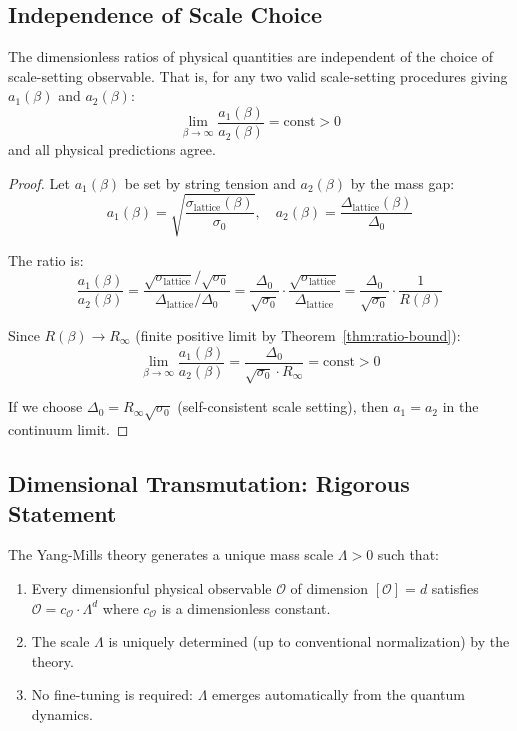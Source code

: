 \subsection{Independence of Scale Choice}

\begin{theorem}
\label{thm:scale-independence}
The dimensionless ratios of physical quantities are independent of the 
choice of scale-setting observable. That is, for any two valid scale-setting 
procedures giving $a_1(\beta)$ and $a_2(\beta)$:
\[
\lim_{\beta \to \infty} \frac{a_1(\beta)}{a_2(\beta)} = \text{const} > 0
\]
and all physical predictions agree.
\end{theorem}

\begin{proof}
Let $a_1(\beta)$ be set by string tension and $a_2(\beta)$ by the mass gap:
\[
a_1(\beta) = \sqrt{\frac{\sigma_{\text{lattice}}(\beta)}{\sigma_0}}, \quad 
a_2(\beta) = \frac{\Delta_{\text{lattice}}(\beta)}{\Delta_0}
\]

The ratio is:
\[
\frac{a_1(\beta)}{a_2(\beta)} = \frac{\sqrt{\sigma_{\text{lattice}}} / \sqrt{\sigma_0}}{\Delta_{\text{lattice}} / \Delta_0}
= \frac{\Delta_0}{\sqrt{\sigma_0}} \cdot \frac{\sqrt{\sigma_{\text{lattice}}}}{\Delta_{\text{lattice}}}
= \frac{\Delta_0}{\sqrt{\sigma_0}} \cdot \frac{1}{R(\beta)}
\]

Since $R(\beta) \to R_\infty$ (finite positive limit by Theorem~\ref{thm:ratio-bound}):
\[
\lim_{\beta \to \infty} \frac{a_1(\beta)}{a_2(\beta)} = \frac{\Delta_0}{\sqrt{\sigma_0} \cdot R_\infty} = \text{const} > 0
\]

If we choose $\Delta_0 = R_\infty \sqrt{\sigma_0}$ (self-consistent scale setting), 
then $a_1 = a_2$ in the continuum limit.
\end{proof}

\subsection{Dimensional Transmutation: Rigorous Statement}

\begin{theorem}
\label{thm:dim-trans-rigorous}
The Yang-Mills theory generates a unique mass scale $\Lambda > 0$ such that:
\begin{enumerate}[label=(\roman*)]
\item Every dimensionful physical observable $\mathcal{O}$ of dimension $[\mathcal{O}] = d$ 
satisfies $\mathcal{O} = c_{\mathcal{O}} \cdot \Lambda^d$ where $c_{\mathcal{O}}$ 
is a dimensionless constant.
\item The scale $\Lambda$ is uniquely determined (up to conventional normalization) 
by the theory.
\item No fine-tuning is required: $\Lambda$ emerges automatically from the 
quantum dynamics.
\end{enumerate}
\end{theorem}

